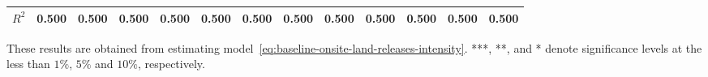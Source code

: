 \begin{table}[H]
{\begin{tabular}{@{}lllllllllllll@{}}
            $R^2$                                      & 0.500     & 0.500     & 0.500     & 0.500     & 0.500     & 0.500     & 0.500                & 0.500                & 0.500                & 0.500             & 0.500             & 0.500             \\ \bottomrule\bottomrule
        \end{tabular}%
    }
    \begin{minipage}{18cm}
        \vspace{0.05in}
        These results are obtained from estimating model~\ref{eq:baseline-onsite-land-releases-intensity}. ***, **, and * denote significance levels at the less than $1\%$, $5\%$ and $10\%$, respectively.
    \end{minipage}
\end{table}